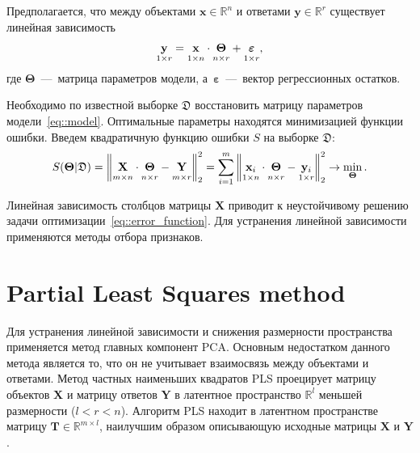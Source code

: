 \documentclass[12pt,twoside]{article}
\newcommand{\bx}{\mathbf{x}}
\newcommand{\by}{\mathbf{y}}
\newcommand{\bY}{\mathbf{Y}}
\newcommand{\bX}{\mathbf{X}}
\newcommand{\bT}{\mathbf{T}}
\newcommand{\bTheta}{\boldsymbol{\Theta}}
\begin{document}
Предполагается, что между объектами $\bx \in \mathbb{R}^n$ и ответами $\by \in \mathbb{R}^r$ существует линейная зависимость 
\begin{equation}
 \underset{1 \times r}{\by} = \underset{1 \times n}{\vphantom{\by}\bx} \cdot \underset{n \times r}{\vphantom{\by}\bTheta} + \underset{1 \times r}{\vphantom{\by}\boldsymbol{\varepsilon}}, 
\label{eq::model}
\end{equation}
где $\bTheta$~---~матрица параметров модели, а~$\boldsymbol{\varepsilon}$~---~вектор регрессионных остатков.

Необходимо по известной выборке $\mathfrak{D}$ восстановить матрицу параметров модели~\eqref{eq::model}.
Оптимальные параметры находятся минимизацией функции ошибки.
Введем квадратичную функцию ошибки $S$ на выборке $\mathfrak{D}$:
\begin{equation}
	S(\bTheta | \mathfrak{D}) = {\left\| \underset{m \times n}{\vphantom{\by}\mathbf{X}} \cdot \underset{n \times r}{\vphantom{\by}\bTheta} - \underset{m \times r}{\vphantom{\by}\mathbf{Y}} \right\| }_2^2 = \sum_{i=1}^m \left\| \underset{1 \times n}{\vphantom{\by}\bx_i} \cdot \underset{n \times r}{\vphantom{\by}\bTheta} - \underset{1 \times r}{\vphantom{\by}\by_i} \right\|_2^2 \rightarrow\min_{\bTheta}.
\label{eq::error_function}
\end{equation}
 
Линейная зависимость столбцов матрицы $\bX$ приводит к неустойчивому решению задачи оптимизации~\eqref{eq::error_function}. Для устранения линейной зависимости применяются методы отбора признаков.

\section{Partial Least Squares method}

Для устранения линейной зависимости и снижения размерности пространства применяется метод главных компонент PCA. 
Основным недостатком данного метода является то, что он не учитывает взаимосвязь между объектами и ответами.
Метод частных наименьших квадратов PLS проецирует матрицу объектов $\bX$ и матрицу ответов $\bY$ в латентное пространство $\mathbb{R}^l$ меньшей размерности ($l < r < n$).
Алгоритм PLS находит в латентном пространстве матрицу $\bT \in \mathbb{R}^{m \times l}$, наилучшим образом описывающую исходные матрицы $\bX$ и $\bY$.
\end{document}
